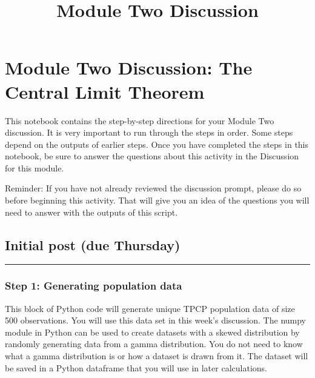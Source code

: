 \documentclass[11pt]{article}
\title{Module Two Discussion}
\begin{document}
    
    
    \maketitle
    
    

    
    \hypertarget{module-two-discussion-the-central-limit-theorem}{%
\section{Module Two Discussion: The Central Limit
Theorem}\label{module-two-discussion-the-central-limit-theorem}}

This notebook contains the step-by-step directions for your Module Two
discussion. It is very important to run through the steps in order. Some
steps depend on the outputs of earlier steps. Once you have completed
the steps in this notebook, be sure to answer the questions about this
activity in the Discussion for this module.

Reminder: If you have not already reviewed the discussion prompt, please
do so before beginning this activity. That will give you an idea of the
questions you will need to answer with the outputs of this script.

    \hypertarget{initial-post-due-thursday}{%
\subsection{Initial post (due
Thursday)}\label{initial-post-due-thursday}}

\begin{center}\rule{0.5\linewidth}{\linethickness}\end{center}

    \hypertarget{step-1-generating-population-data}{%
\subsubsection{Step 1: Generating population
data}\label{step-1-generating-population-data}}

This block of Python code will generate unique TPCP population data of
size 500 observations. You will use this data set in this week's
discussion. The numpy module in Python can be used to create datasets
with a skewed distribution by randomly generating data from a gamma
distribution. You do not need to know what a gamma distribution is or
how a dataset is drawn from it. The dataset will be saved in a Python
dataframe that you will use in later calculations.
\end{document}
